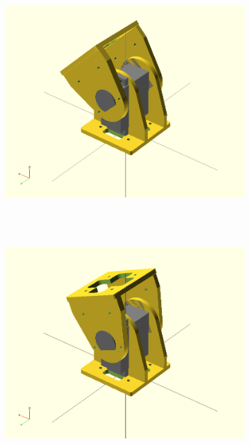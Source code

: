 \begin{figure}[h]
		\centering
        \begin{subfigure}[b]{0.18\textwidth}
                \centering
                \includegraphics[width=\textwidth]{images/Gait_osc_offset_45.png}
                ~
                \label{fig:Gait_osc_offset_45}
        \end{subfigure}
        ~
        \begin{subfigure}[b]{0.18\textwidth}
                \centering
                \includegraphics[width=\textwidth]{images/Gait_osc_offset_67_5.png}
                ~
                \label{fig:Gait_osc_offset_67_5}

\end{subfigure}
\end{figure}
